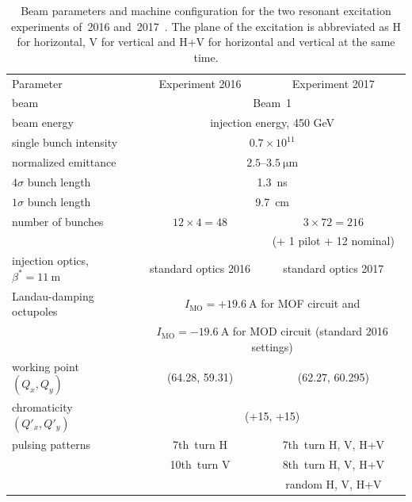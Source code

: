 \documentclass[
prstab
,reprint
,linenumbers
,longbibliography
,preprintnumbers
,showkeys
,amsfonts,amssymb,amsmath
,floatfix
]{revtex4-1}
\newcommand{\q}[2]{\ensuremath{#1\ \mathrm{#2}}} %
\begin{document}
\begin{table}
  \caption{Beam parameters and machine configuration for the two
    resonant excitation experiments of~2016
    and~2017~\cite{resexmd2016, resexmd2017}. The plane of the
    excitation is abbreviated as H for horizontal, V for vertical and
    H+V for horizontal and vertical at the same time.}
  \label{tab:md_param}
  \begin{ruledtabular}
    \begin{tabular}{lcc}
      Parameter & Experiment 2016 & Experiment 2017  \\
      \colrule
      beam &\multicolumn{2}{c}{Beam~1} \\
      beam energy &\multicolumn{2}{c}{injection energy, 450 GeV} \\\hline
      single bunch intensity &\multicolumn{2}{c}{$0.7\times10^{11}$} \\
      normalized emittance &\multicolumn{2}{c}{$2.5$--\q{3.5}{\mu m}} \\
      $4\sigma$ bunch length & \multicolumn{2}{c}{1.3~ns}\\
      $1\sigma$ bunch length & \multicolumn{2}{c}{9.7~cm}\\
      number of bunches & $12 \times 4 = 48$ & $3 \times 72 = 216$ \\
                &  & (+ 1 pilot + 12 nominal) \\\hline
      injection optics, $\beta^* = \q{11}{m}$ & standard optics 2016 & standard optics 2017\\
      Landau-damping octupoles  & \multicolumn{2}{c}{$I_{\mathrm{MO}}
                                  = \q{+19.6}{A}$ for MOF circuit and}\\
                & \multicolumn{2}{c}{$I_{\mathrm{MO}} = \q{-19.6}{A}$
                  for MOD circuit (standard 2016 settings)} \\ \hline
      working point $(Q_x, Q_y)$ & (64.28, 59.31) & (62.27, 60.295) \\
      chromaticity $(Q'_x, Q'_y)$ & \multicolumn{2}{c}{(+15, +15)}\\ \hline
      pulsing patterns  & 7th~turn H & 7th~turn H, V, H+V \\
                & 10th~turn V & 8th~turn H, V, H+V \\
                & &  random  H, V, H+V\\
    \end{tabular}
  \end{ruledtabular}
\end{table}
\end{document}
